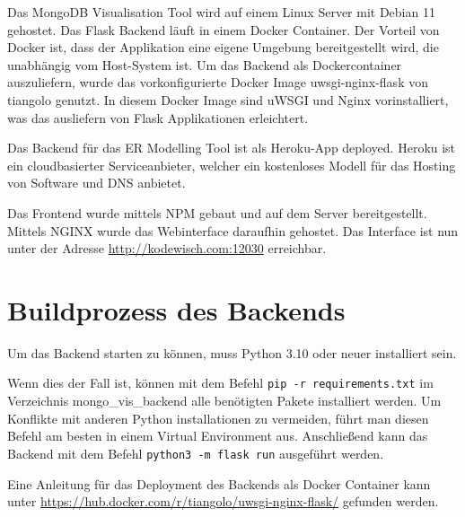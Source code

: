 \iffalse
Aufgabe des Kapitels Inbetriebnahme ist es, die Überführung der in 
Kapitel \ref{cha:implementierung} entwickelte Lösung in das betriebliche 
Umfeld aufzuzeigen. Dabei wird beispielsweise die Inbetriebnahme eines 
Programms beschrieben oder die Integration eines erstellten 
Programmodules dargestellt.

Bei der Software-Erstellung entspricht dieses Kapitel der 
Auslieferungsphase (Deployment) im \ac{rup}.
\fi

Das MongoDB Visualisation Tool wird auf einem Linux Server mit Debian 11 gehostet.
Das Flask Backend läuft in einem Docker Container.
Der Vorteil von Docker ist, dass der Applikation eine eigene Umgebung bereitgestellt wird, die unabhängig vom Host-System ist.
Um das Backend als Dockercontainer auszuliefern, wurde das vorkonfigurierte Docker Image uwsgi-nginx-flask von tiangolo genutzt.
In diesem Docker Image sind uWSGI und Nginx vorinstalliert, was das ausliefern von Flask Applikationen erleichtert.
~\autocite{tiangolo:uwsgi-nginx-flask}

Das Backend für das ER Modelling Tool ist als Heroku-App deployed.
Heroku ist ein cloudbasierter Serviceanbieter, welcher ein kostenloses Modell für das Hosting von Software und DNS anbietet.
~\autocite{heroku:heroku}

Das Frontend wurde mittels NPM gebaut und auf dem Server bereitgestellt.
Mittels NGINX wurde das Webinterface daraufhin gehostet. 
Das Interface ist nun unter der Adresse \url{http://kodewisch.com:12030} erreichbar.

\section{Buildprozess des Backends}
\label{sec:build_backend}

Um das Backend starten zu können, muss Python 3.10 oder neuer installiert sein.

Wenn dies der Fall ist, können mit dem Befehl \lstinline{pip -r requirements.txt} im Verzeichnis mongo\_vis\_backend alle benötigten Pakete installiert werden.
Um Konflikte mit anderen Python installationen zu vermeiden, führt man diesen Befehl am besten in einem Virtual Environment aus.
Anschließend kann das Backend mit dem Befehl \lstinline{python3 -m flask run} ausgeführt werden.

Eine Anleitung für das Deployment des Backends als Docker Container kann unter \url{https://hub.docker.com/r/tiangolo/uwsgi-nginx-flask/} gefunden werden.


